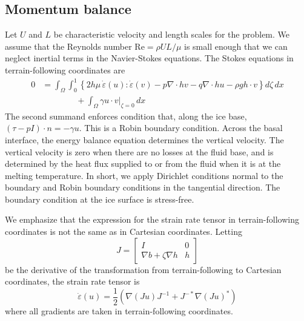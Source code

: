 \documentclass{article}
\theoremstyle{definition}
\theoremstyle{plain}
\begin{document}
\subsection{Momentum balance}

Let $U$ and $L$ be characteristic velocity and length scales for the problem.
We assume that the Reynolds number $\text{Re} = \rho UL/\mu$ is small enough that we can neglect inertial terms in the Navier-Stokes equations.
The Stokes equations in terrain-following coordinates are
\begin{align}
    0 & = \int_\Omega\int_0^1\left\{2 h\mu\,\dot\varepsilon(u):\dot\varepsilon(v) - p\nabla\cdot hv - q\nabla\cdot hu - \rho gh\cdot v\right\}d\zeta\,dx \nonumber\\
    & \qquad\qquad +\int_\Omega \gamma u\cdot v\big|_{\zeta = 0}\,dx
\end{align}
The second summand enforces condition that, along the ice base, $(\tau - pI)\cdot n = -\gamma u$.
This is a Robin boundary condition.
Across the basal interface, the energy balance equation determines the vertical velocity.
The vertical velocity is zero when there are no losses at the fluid base, and is determined by the heat flux supplied to or from the fluid when it is at the melting temperature.
In short, we apply Dirichlet conditions normal to the boundary and Robin boundary conditions in the tangential direction.
The boundary condition at the ice surface is stress-free.

We emphasize that the expression for the strain rate tensor in terrain-following coordinates is not the same as in Cartesian coordinates.
Letting
\begin{equation}
    J = \left[\begin{matrix} I & 0 \\ \nabla b + \zeta\nabla h & h \end{matrix}\right]
\end{equation}
be the derivative of the transformation from terrain-following to Cartesian coordinates, the strain rate tensor is
\begin{equation}
    \dot\varepsilon(u) = \frac{1}{2}\left(\nabla(Ju)J^{-1} + J^{-*}\nabla(Ju)^*\right)
\end{equation}
where all gradients are taken in terrain-following coordinates.
\end{document}
